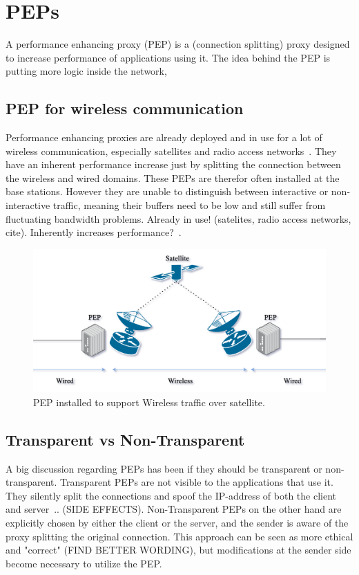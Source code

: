 \documentclass[a4paper,english, 11pt]{report}
\begin{document}
\section{PEPs}
A performance enhancing proxy (PEP) is a (connection splitting) proxy designed to increase performance of applications using it. The idea behind the PEP is putting more logic inside the network,

\subsection{PEP for wireless communication}
Performance enhancing proxies are already deployed and in use for a lot of wireless communication, especially satellites and radio access networks~\cite{tcp_mmwave_proxy}. They have an inherent performance increase just by splitting the connection between the wireless and wired domains. These PEPs are therefor often installed at the base stations. However they are unable to distinguish between interactive or non-interactive traffic, meaning their buffers need to be low and still suffer from fluctuating bandwidth problems.
 Already in use! (satelites, radio access networks, cite). Inherently increases performance?~\cite{tcp_mmwave_proxy}.

\begin{figure}[h] %
	\centering
	\includegraphics[scale=0.50]{../diagrams/drawio/pep_satellite.png}
  	\caption{PEP installed to support Wireless traffic over satellite.}
  	\label{fig:blockage}
\end{figure}

\subsection{Transparent vs Non-Transparent}
A big discussion regarding PEPs has been if they should be transparent or non-transparent. Transparent PEPs are not visible to the applications that use it. They silently split the connections and spoof the IP-address of both the client and server~\cite{pep_dna}.. (SIDE EFFECTS). Non-Transparent PEPs on the other hand are explicitly chosen by either the client or the server, and the sender is aware of the proxy splitting the original connection. This approach can be seen as more ethical and "correct" (FIND BETTER WORDING), but modifications at the sender side become necessary to utilize the PEP.
\end{document}
